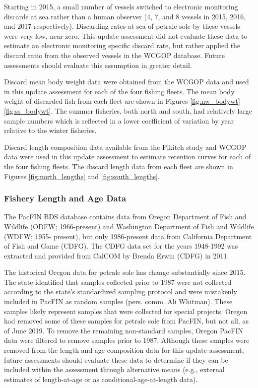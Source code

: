\documentclass[12pt,]{article}
\begin{document}
Starting in 2015, a small number of vessels switched to electronic
monitoring discards at sea rather than a human observer (4, 7, and 8
vessels in 2015, 2016, and 2017 respectively). Discarding rates at sea
of petrale sole by these vessels were very low, near zero. This update
assessment did not evaluate these data to estimate an electronic
monitoring specific discard rate, but rather applied the discard ratio
from the observed vessels in the WCGOP database. Future assessments
should evaluate this assumption in greater detail.

Discard mean body weight data were obtained from the WCGOP data and used
in this update assessment for each of the four fishing fleets. The mean
body weight of discarded fish from each fleet are shown in Figures
\ref{fig:nw_bodywt} - \ref{fig:ss_bodywt}. The summer fisheries, both
north and south, had relatively large sample numbers which is reflected
in a lower coefficient of variation by year relative to the winter
fisheries.

Discard length composition data available from the Pikitch study and
WCGOP data were used in this update assessment to estimate retention
curves for each of the four fishing fleets. The discard length data from
each fleet are shown in Figures \ref{fig:north_lengths} and
\ref{fig:south_lengths}.

\hypertarget{fishery_data}{\subsubsection{Fishery Length and Age
Data}\label{fishery_data}}

The PacFIN BDS database contains data from Oregon Department of Fish and
Wildlife (ODFW; 1966-present) and Washington Department of Fish and
Wildlife (WDFW; 1955- present), but only 1986-present data from
California Department of Fish and Game (CDFG). The CDFG data set for the
years 1948-1992 was extracted and provided from CalCOM by Brenda Erwin
(CDFG) in 2011.

The historical Oregon data for petrale sole has change substantially
since 2015. The state identified that samples collected prior to 1987
were not collected according to the state's standardized sampling
protocol and were mistakenly included in PacFIN as random samples (pers.
comm. Ali Whitman). These samples likely represent samples that were
collected for special projects. Oregon had removed some of these samples
for petrale sole from PacFIN, but not all, as of June 2019. To remove
the remaining non-standard samples, Oregon PacFIN data were filtered to
remove samples prior to 1987. Although these samples were removed from
the length and age composition data for this update assessment, future
assessments should evaluate these data to determine if they can be
included within the assessment through alternative means (e.g., external
estimates of length-at-age or as conditional-age-at-length data).
\end{document}
